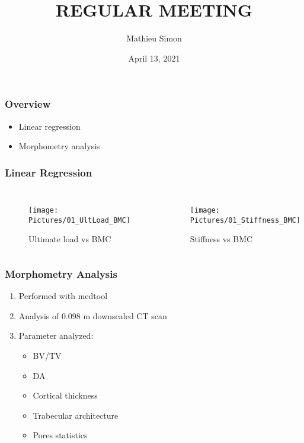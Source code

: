 \documentclass[xcolor=table]{beamer}
\title[Regular Meeting]{
\uppercase{Regular Meeting}
}
\author{Mathieu Simon}
\institute[University of Bern]
{
MSc - Biomedical Engineering \\
University of Bern, Faculty of Medicine \\
\medskip
}
\date{April 13, 2021}
\begin{document}
\begin{frame}
\titlepage
\end{frame}


\begin{frame}
	\frametitle{Overview}
	\begin{itemize}
		\item Linear regression
		\item Morphometry analysis
	\end{itemize}
\end{frame}


\begin{frame}
	\frametitle{Linear Regression}
	\begin{columns}
		\centering
		\begin{figure}
			\texttt{[image: Pictures/01\_UltLoad\_BMC]}
			\caption{Ultimate load vs BMC}
		\end{figure}
		\centering
		\begin{figure}
			\texttt{[image: Pictures/01\_Stiffness\_BMC]}
			\caption{Stiffness vs BMC}
		\end{figure}
	\end{columns}
\end{frame}


\begin{frame}
	\frametitle{Morphometry Analysis}
	\begin{enumerate}
		\item Performed with medtool
		\item Analysis of 0.098 \si{\micro}m downscaled \si{\micro}CT scan
		\item Parameter analyzed:
		\begin{itemize}
			\item BV/TV
			\item DA
			\item Cortical thickness
			\item Trabecular architecture
			\item Pores statistics
		\end{itemize}
	\end{enumerate}
\end{frame}
\end{document}
